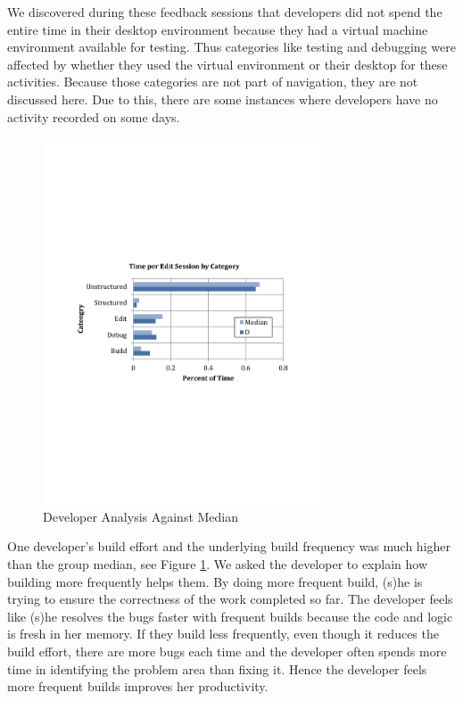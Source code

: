 \documentclass{sig-alternate}
\begin{document}
We discovered during these feedback sessions that developers did not spend the entire time in their desktop environment because they had a virtual machine environment available for testing. Thus categories like testing and debugging were affected by whether they used the virtual environment or their desktop for these activities.  Because those categories are not part of navigation, they are not discussed here. Due to this, there are some instances where developers have no activity recorded on some days.  

\begin{figure}
	\includegraphics[width=3.3in]{developerEmedian.pdf}
	\caption{Developer Analysis Against Median}
	\label{fig:developercomparison}
\end{figure}


One developer's build effort and the underlying build frequency was much higher than the group median, see Figure \ref{fig:developercomparison}.  We asked the developer to explain how building more frequently helps them. By doing more frequent build, (s)he is trying to ensure the correctness of the work completed so far. The developer feels like (s)he resolves the bugs faster with frequent builds because the code and logic is fresh in her memory. If they build less frequently, even though it reduces the build effort, there are more bugs each time and the developer often spends more time in identifying the problem area than fixing it. Hence the developer feels more frequent builds improves her productivity.  
\end{document}
